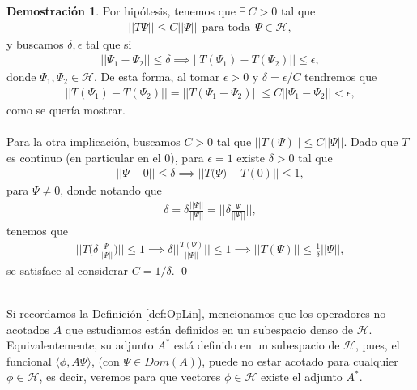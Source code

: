 \documentclass[12pt]{article}
\theoremstyle{definition}
\newtheorem*{demo}{Demostración}
\begin{document}
\begin{demo}
    Por hipótesis, tenemos que $\exists\: C>0$ tal que 
    \begin{align*}
        ||T\Psi||\leq C||\Psi||\:\: \text{para toda}\:\: \Psi\in\mathcal{H},
    \end{align*}
    y buscamos $\delta,\epsilon$ tal que si
    \begin{align*}
        ||\Psi_{1}-\Psi_{2}||\leq \delta \implies ||T(\Psi_{1}) - T(\Psi_{2})||\leq \epsilon,
    \end{align*}
    donde $\Psi_{1},\Psi_{2}\in\mathcal{H}$. De esta forma, al tomar $\epsilon>0$ y $\delta = \epsilon/C$ tendremos que
    \begin{align*}
        ||T(\Psi_{1}) - T(\Psi_{2})|| = ||T(\Psi_{1}-\Psi_{2})||\leq C||\Psi_{1}-\Psi_{2}|| < \epsilon,
    \end{align*}
    como se quería mostrar. \\ \\
    Para la otra implicación, buscamos $C>0$ tal que $||T(\Psi)||\leq C||\Psi||$. Dado que $T$ es continuo (en particular en el 0), para $\epsilon = 1$ existe $\delta > 0$ tal que
    \begin{align*}
        \big|\big|\Psi - 0 \big|\big| \leq \delta \implies \big|\big|T\big(\Psi\big)-T(0)\big|\big| \leq 1,
    \end{align*}
    para $\Psi\neq 0$, donde notando que
    \begin{align*}
        \delta = \delta\frac{||\Psi||}{||\Psi||} = \bigg|\bigg|\delta\frac{\Psi}{||\Psi||}\bigg|\bigg|,
    \end{align*}
    tenemos que 
    \begin{align*}
        \bigg|\bigg|T\bigg(\delta\frac{\Psi}{||\Psi||}\bigg)\bigg|\bigg| \leq 1 \implies \delta\bigg|\bigg|\frac{T(\Psi)}{||\Psi||}\bigg|\bigg| \leq 1 \implies ||T(\Psi)|| \leq \frac{1}{\delta}||\Psi||,
    \end{align*}
    se satisface al considerar $C = 1/\delta$.
    \qed
\end{demo}
\noindent
\\
 Si recordamos la Definición \ref{def:OpLin}, mencionamos que los operadores no-acotados $A$ que estudiamos están definidos en un subespacio denso de $\mathcal{H}$. Equivalentemente, su adjunto $A^*$ está definido en un subespacio de $\mathcal{H}$, pues, el funcional $\langle\phi,A\Psi\rangle$, (con $\Psi\in Dom(A)$), puede no estar acotado para cualquier $\phi\in\mathcal{H}$, es decir, veremos para que vectores $\phi\in\mathcal{H}$ existe el adjunto $A^*$.
\end{document}
